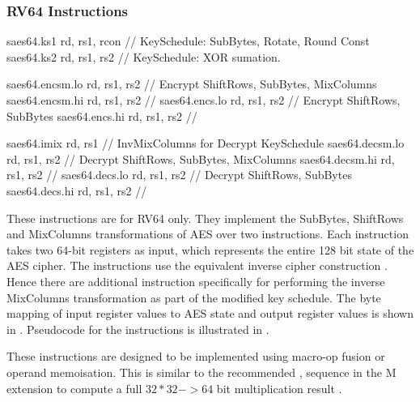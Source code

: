 


\newpage
\subsubsection{RV64 Instructions}
\label{sec:scalar:aes:rv64}

\begin{cryptoisa}
saes64.ks1      rd, rs1, rcon  // KeySchedule: SubBytes, Rotate, Round Const
saes64.ks2      rd, rs1, rs2   // KeySchedule: XOR sumation.

saes64.encsm.lo rd, rs1, rs2   // Encrypt ShiftRows, SubBytes, MixColumns
saes64.encsm.hi rd, rs1, rs2   //
saes64.encs.lo  rd, rs1, rs2   // Encrypt ShiftRows, SubBytes
saes64.encs.hi  rd, rs1, rs2   //

saes64.imix     rd, rs1        // InvMixColumns for Decrypt KeySchedule
saes64.decsm.lo rd, rs1, rs2   // Decrypt ShiftRows, SubBytes, MixColumns
saes64.decsm.hi rd, rs1, rs2   //
saes64.decs.lo  rd, rs1, rs2   // Decrypt ShiftRows, SubBytes
saes64.decs.hi  rd, rs1, rs2   //
\end{cryptoisa}

These instructions are for RV64 only.
They implement the SubBytes, ShiftRows and MixColumns transformations of AES
over two instructions.
Each instruction takes two 64-bit registers as input, which represents
the entire 128 bit state of the AES cipher.
The instructions use the equivalent inverse cipher construction
\cite[Page 23, Section 5.3.5]{nist:fips:197}.
Hence there are additional instruction specifically for performing the
inverse MixColumns transformation as part of the modified key schedule.
The byte mapping of input register values to AES state and output register
values is shown in .
Pseudocode for the instructions is illustrated in
.

These instructions are designed to be implemented using macro-op fusion or
operand memoisation.
This is similar to the recommended , 
sequence in the M extension to compute a full $32*32->64$ bit
multiplication result \cite[Section 7.1]{riscv:spec:user}.


